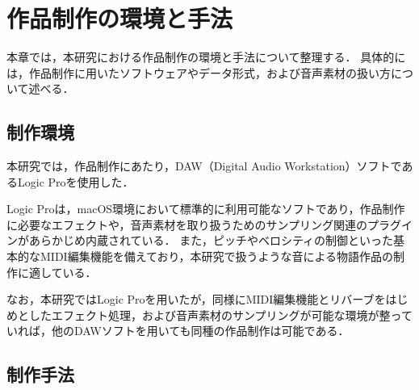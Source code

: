 
\section{作品制作の環境と手法}
本章では，本研究における作品制作の環境と手法について整理する．
%
具体的には，作品制作に用いたソフトウェアやデータ形式，および音声素材の扱い方について述べる．

\subsection{制作環境}


本研究では，作品制作にあたり，DAW（Digital Audio Workstation）ソフトであるLogic Pro\cite{logicpro}を使用した．

Logic Proは，macOS環境において標準的に利用可能なソフトであり，作品制作に必要なエフェクトや，音声素材を取り扱うためのサンプリング関連のプラグインがあらかじめ内蔵されている．
%
また，ピッチやベロシティの制御といった基本的なMIDI編集機能を備えており，本研究で扱うような音による物語作品の制作に適している．

なお，本研究ではLogic Proを用いたが，同様にMIDI編集機能とリバーブをはじめとしたエフェクト処理，および音声素材のサンプリングが可能な環境が整っていれば，他のDAWソフトを用いても同種の作品制作は可能である．

\subsection{制作手法}


